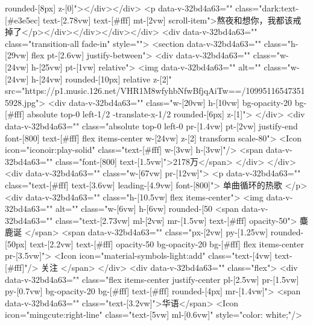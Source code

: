 rounded-[8px] z-[0]"></div></div> <p data-v-32bd4a63="" class="dark:text-[#e3e5ec] text-[2.78vw] text-[#fff] mt-[2vw] scroll-item">熬夜和想你，我都该戒掉了</p></div></div></div></div>
            <div data-v-32bd4a63="" class="transition-all fade-in" style="">
                <section data-v-32bd4a63="" class="h-[29vw] flex pt-[2.6vw] justify-between">
                    <div data-v-32bd4a63="" class="w-[24vw] h-[25vw] pt-[1vw] relative">
                        <img data-v-32bd4a63="" alt="" class="w-[24vw] h-[24vw] rounded-[10px] relative z-[2]" src="https://p1.music.126.net/VHR1M8wfyhbNfwBfjqAiTw==/109951165473515928.jpg"> 
                        <div data-v-32bd4a63="" class="w-[20vw] h-[10vw] bg-opacity-20 bg-[#fff] absolute top-0 left-1/2 -translate-x-1/2 rounded-[6px] z-[1]">
                        </div> 
                        <div data-v-32bd4a63="" class="absolute top-0 left-0 pr-[1.4vw] pt-[2vw] justify-end font-[800] text-[#fff] flex items-center w-[24vw] z-[2] transform scale-80">
                            <Icon icon="iconoir:play-solid" class="text-[#fff] w-[3vw] h-[3vw]"/>
                            <span data-v-32bd4a63="" class="font-[800] text-[1.5vw]">2178万</span>
                        </div>
                    </div> 
                    <div data-v-32bd4a63="" class="w-[67vw] pr-[12vw]">
                        <p data-v-32bd4a63="" class="text-[#fff] text-[3.6vw] leading-[4.9vw] font-[800]">
                            单曲循环的热歌
                        </p> 
                        <div data-v-32bd4a63="" class="h-[10.5vw] flex items-center">
                            <img data-v-32bd4a63="" alt="" class="w-[6vw] h-[6vw] rounded-[50%
                            <span data-v-32bd4a63="" class="text-[2.73vw] ml-[2vw] mr-[1.5vw] text-[#fff] opacity-50">
                                   麋鹿诞
                            </span> 
                            <span data-v-32bd4a63="" class="px-[2vw] py-[1.25vw] rounded-[50px] text-[2.2vw] text-[#fff] opacity-50 bg-opacity-20 bg-[#fff] flex items-center pr-[3.5vw]">
                                <Icon icon="material-symbols-light:add" class="text-[4vw] text-[#fff]"/>
                                关注
                            </span>
                        </div> 
                        <div data-v-32bd4a63="" class="flex">
                            <div data-v-32bd4a63="" class="flex items-center justify-center pl-[2.5vw] pr-[1.5vw] py-[0.7vw] bg-opacity-20 bg-[#fff] text-[#fff] rounded-[4px] mr-[1.4vw]">
                                <span data-v-32bd4a63="" class="text-[3.2vw]">华语</span> 
                                <Icon icon="mingcute:right-line" class="text-[5vw] ml-[0.6vw]" style="color: white;"/>
                                

